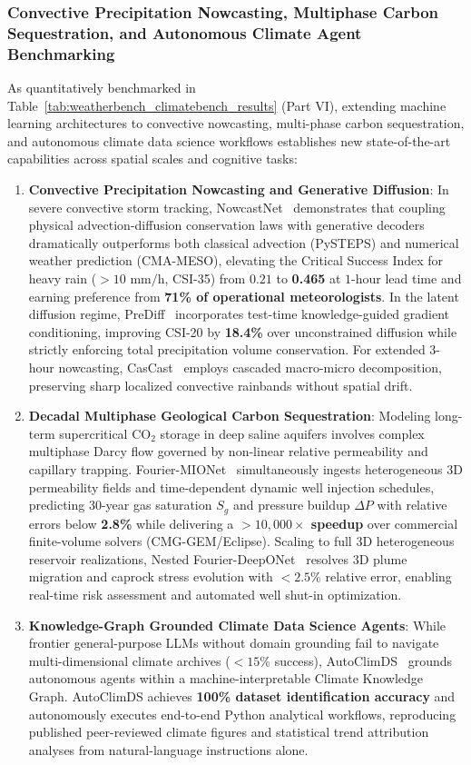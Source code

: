 \subsubsection{Convective Precipitation Nowcasting, Multiphase Carbon Sequestration, and Autonomous Climate Agent Benchmarking}
As quantitatively benchmarked in Table~\ref{tab:weatherbench_climatebench_results} (Part VI), extending machine learning architectures to convective nowcasting, multi-phase carbon sequestration, and autonomous climate data science workflows establishes new state-of-the-art capabilities across spatial scales and cognitive tasks:
\begin{enumerate}
    \item \textbf{Convective Precipitation Nowcasting and Generative Diffusion}: In severe convective storm tracking, NowcastNet~\cite{zhang2023nowcastnet} demonstrates that coupling physical advection-diffusion conservation laws with generative decoders dramatically outperforms both classical advection (PySTEPS) and numerical weather prediction (CMA-MESO), elevating the Critical Success Index for heavy rain ($>10\text{ mm/h}$, CSI-35) from $0.21$ to \textbf{0.465} at $1\text{-hour}$ lead time and earning preference from \textbf{71\% of operational meteorologists}. In the latent diffusion regime, PreDiff~\cite{gao2023prediff} incorporates test-time knowledge-guided gradient conditioning, improving CSI-20 by \textbf{18.4\%} over unconstrained diffusion while strictly enforcing total precipitation volume conservation. For extended 3-hour nowcasting, CasCast~\cite{gong2024cascast} employs cascaded macro-micro decomposition, preserving sharp localized convective rainbands without spatial drift.
    \item \textbf{Decadal Multiphase Geological Carbon Sequestration}: Modeling long-term supercritical $\text{CO}_2$ storage in deep saline aquifers involves complex multiphase Darcy flow governed by non-linear relative permeability and capillary trapping. Fourier-MIONet~\cite{jiang2024fouriermionet} simultaneously ingests heterogeneous 3D permeability fields and time-dependent dynamic well injection schedules, predicting 30-year gas saturation $S_g$ and pressure buildup $\Delta P$ with relative errors below \textbf{2.8\%} while delivering a \textbf{$>10{,}000\times$ speedup} over commercial finite-volume solvers (CMG-GEM/Eclipse). Scaling to full 3D heterogeneous reservoir realizations, Nested Fourier-DeepONet~\cite{lee2024nested} resolves 3D plume migration and caprock stress evolution with $<2.5\%$ relative error, enabling real-time risk assessment and automated well shut-in optimization.
    \item \textbf{Knowledge-Graph Grounded Climate Data Science Agents}: While frontier general-purpose LLMs without domain grounding fail to navigate multi-dimensional climate archives ($<15\%$ success), AutoClimDS~\cite{jaber2025autoclimds} grounds autonomous agents within a machine-interpretable Climate Knowledge Graph. AutoClimDS achieves \textbf{100\% dataset identification accuracy} and autonomously executes end-to-end Python analytical workflows, reproducing published peer-reviewed climate figures and statistical trend attribution analyses from natural-language instructions alone.
\end{enumerate}

